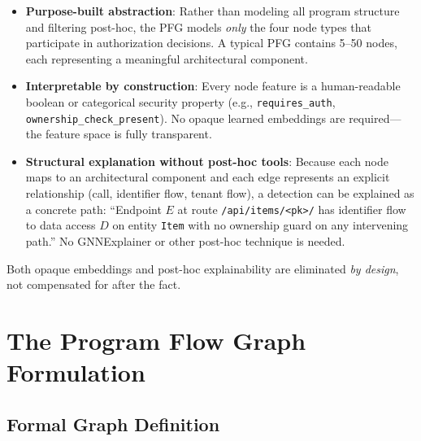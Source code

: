 \begin{itemize}
    \item \textbf{Purpose-built abstraction}: Rather than modeling all program structure and filtering post-hoc, the PFG models \emph{only} the four node types that participate in authorization decisions. A typical PFG contains 5--50 nodes, each representing a meaningful architectural component.

    \item \textbf{Interpretable by construction}: Every node feature is a human-readable boolean or categorical security property (e.g., \texttt{requires\_auth}, \texttt{ownership\_check\_present}). No opaque learned embeddings are required—the feature space is fully transparent.

    \item \textbf{Structural explanation without post-hoc tools}: Because each node maps to an architectural component and each edge represents an explicit relationship (call, identifier flow, tenant flow), a detection can be explained as a concrete path: ``Endpoint $E$ at route \texttt{/api/items/<pk>/} has identifier flow to data access $D$ on entity \texttt{Item} with no ownership guard on any intervening path.'' No GNNExplainer \cite{ying2019gnnexplainer} or other post-hoc technique is needed.
\end{itemize}

Both opaque embeddings and post-hoc explainability are eliminated \emph{by design}, not compensated for after the fact.

\section{The Program Flow Graph Formulation}
\label{sec:pfg-formulation}

\subsection{Formal Graph Definition}

